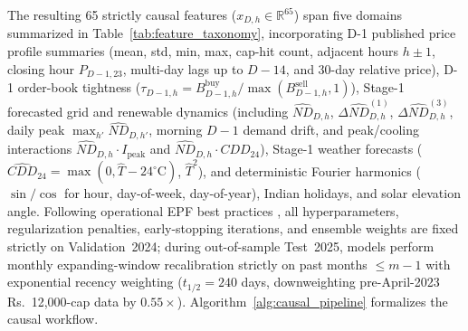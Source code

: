 \documentclass[journal,10pt,twocolumn]{IEEEtran}
\begin{document}
The resulting 65 strictly causal features ($x_{D,h} \in \mathbb{R}^{65}$) span five domains summarized in Table~\ref{tab:feature_taxonomy}, incorporating D-1 published price profile summaries (mean, std, min, max, cap-hit count, adjacent hours $h\pm 1$, closing hour $P_{D-1,23}$, multi-day lags up to $D-14$, and 30-day relative price), D-1 order-book tightness ($\tau_{D-1,h} = B_{D-1,h}^{\text{buy}} / \max(B_{D-1,h}^{\text{sell}}, 1)$), Stage-1 forecasted grid and renewable dynamics (including $\widehat{ND}_{D,h}$, $\Delta \widehat{ND}_{D,h}^{(1)}$, $\Delta \widehat{ND}_{D,h}^{(3)}$, daily peak $\max_{h'} \widehat{ND}_{D,h'}$, morning $D-1$ demand drift, and peak/cooling interactions $\widehat{ND}_{D,h} \cdot I_{\text{peak}}$ and $\widehat{ND}_{D,h} \cdot \widehat{CDD}_{24}$), Stage-1 weather forecasts ($\widehat{CDD}_{24} = \max(0, \hat{T} - 24^\circ\text{C})$, $\hat{T}^2$), and deterministic Fourier harmonics ($\sin/\cos$ for hour, day-of-week, day-of-year), Indian holidays, and solar elevation angle. Following operational EPF best practices \cite{lago2021forecasting}, all hyperparameters, regularization penalties, early-stopping iterations, and ensemble weights are fixed strictly on Validation~2024; during out-of-sample Test~2025, models perform monthly expanding-window recalibration strictly on past months $\le m-1$ with exponential recency weighting ($t_{1/2} = 240$ days, downweighting pre-April-2023 Rs.~12,000-cap data by $0.55\times$). Algorithm~\ref{alg:causal_pipeline} formalizes the causal workflow.
\end{document}
